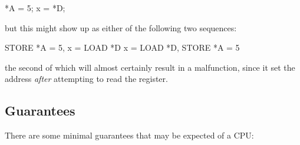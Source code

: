 \begin{VerbatimU}
	*A = 5;
	x = *D;
\end{VerbatimU}

\noindent%
but this might show up as either of the following two sequences:

\begin{VerbatimU}
	STORE *A = 5, x = LOAD *D
	x = LOAD *D, STORE *A = 5
\end{VerbatimU}

\noindent%
the second of which will almost certainly result in a malfunction, since it set
the address \emph{after} attempting to read the register.


\subsection{Guarantees}

There are some minimal guarantees that may be expected of a CPU:

